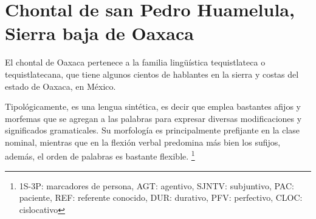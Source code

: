 \section*{Chontal de san Pedro Huamelula, Sierra baja de Oaxaca}

\noindent El chontal de Oaxaca pertenece a la familia lingüística tequistlateca o tequistlatecana, que tiene algunos cientos de hablantes en la sierra y costas del estado de Oaxaca, en México.

Tipológicamente, es una lengua sintética, es decir que emplea bastantes afijos y morfemas que se agregan a las palabras para expresar diversas modificaciones y significados gramaticales. Su morfología es principalmente prefijante en la clase nominal, mientras que en la flexión verbal predomina más bien los sufijos, además, el orden de palabras es bastante flexible. %
\footnote{1S-3P: marcadores de persona, AGT: agentivo, SJNTV: subjuntivo, PAC: paciente, REF: referente conocido, DUR: durativo, PFV: perfectivo, CLOC: cislocativo}
\vspace{0.5cm}

